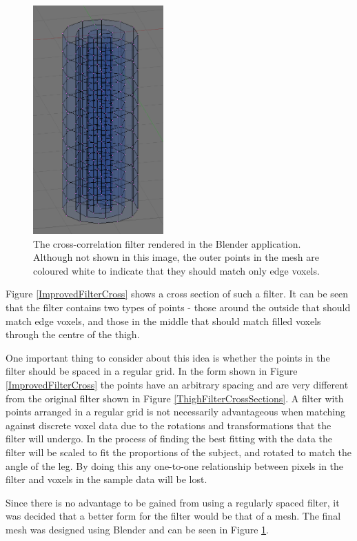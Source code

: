 \begin{figure}[tb]
	\centering
	\includegraphics[width=5cm]{thighmodel.png}
	\caption{The cross-correlation filter rendered in the Blender application.
		Although not shown in this image, the outer points in the mesh are coloured white to indicate that they should
		match only edge voxels.}
	\label{ImprovedFilter}
\end{figure}

Figure \ref{ImprovedFilterCross} shows a cross section of such a filter.
It can be seen that the filter contains two types of points - those around the outside that should match edge voxels,
and those in the middle that should match filled voxels through the centre of the thigh.

One important thing to consider about this idea is whether the points in the filter should be spaced in a regular grid.
In the form shown in Figure \ref{ImprovedFilterCross} the points have an arbitrary spacing and are very different from the original filter shown in Figure \ref{ThighFilterCrossSections}.
A filter with points arranged in a regular grid is not necessarily advantageous when matching against discrete voxel data due to the rotations and transformations that the filter will undergo.
In the process of finding the best fitting with the data the filter will be scaled to fit the proportions of the subject, and rotated to match the angle of the leg.
By doing this any one-to-one relationship between pixels in the filter and voxels in the sample data will be lost.

Since there is no advantage to be gained from using a regularly spaced filter, it was decided that a better form for the filter would be that of a mesh.
The final mesh was designed using Blender \cite{Blender} and can be seen in Figure \ref{ImprovedFilter}.



